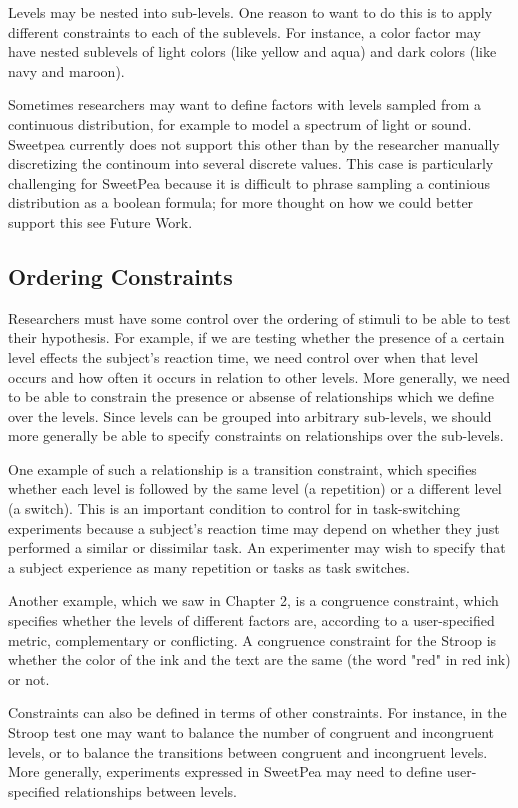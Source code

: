 Levels may be nested into sub-levels. One reason to want to do this is to apply different constraints to each of the sublevels. For instance, a color factor may have nested sublevels of light colors (like yellow and aqua) and dark colors (like navy and maroon).

Sometimes researchers may want to define factors with levels sampled from a continuous distribution, for example to model a spectrum of light or sound. Sweetpea currently does not support this other than by the researcher manually discretizing the continoum into several discrete values. This case is particularly challenging for SweetPea because it is difficult to phrase sampling a continious distribution as a boolean formula; for more thought on how we could better support this see Future Work.

\subsection{Ordering Constraints}

Researchers must have some control over the ordering of stimuli to be able to test their hypothesis. For example, if we are testing whether the presence of a certain level effects the subject's reaction time, we need control over when that level occurs and how often it occurs in relation to other levels. More generally, we need to be able to constrain the presence or absense of relationships which we define over the levels. Since levels can be grouped into arbitrary sub-levels, we should more generally be able to specify constraints on relationships over the sub-levels.

One example of such a relationship is a transition constraint, which specifies whether each level is followed by the same level (a repetition) or a different level (a switch). This is an important condition to control for in task-switching experiments because a subject's reaction time may depend on whether they just performed a similar or dissimilar task. An experimenter may wish to specify that a subject experience as many repetition or tasks as task switches.

Another example, which we saw in Chapter 2, is a congruence constraint, which specifies whether the levels of different factors are, according to a user-specified metric, complementary or conflicting. A congruence constraint for the Stroop is whether the color of the ink and the text are the same (the word "red" in red ink) or not.

Constraints can also be defined in terms of other constraints. For instance, in the Stroop test one may want to balance the number of congruent and incongruent levels, or to balance the transitions between congruent and incongruent levels. More generally, experiments expressed in SweetPea may need to define user-specified relationships between levels.

